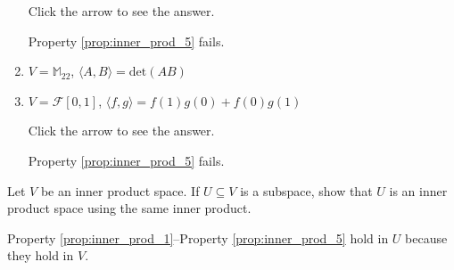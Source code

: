 \documentclass{ximera}
\begin{document}
\begin{problem}
\begin{enumerate}
Click the arrow to see the answer.
\begin{expandable}
Property \ref{prop:inner_prod_5} fails.
\end{expandable}

\item $V = \mathbb{M}_{22}$, $\langle A, B \rangle = \mbox{det}(AB)$

\item $V = \mathcal{F}[0, 1]$, $\langle f, g \rangle = f(1)g(0) + f(0)g(1)$

Click the arrow to see the answer.
\begin{expandable}
Property \ref{prop:inner_prod_5} fails.
\end{expandable}

\end{enumerate}
\end{problem}

\begin{problem}\label{prob:inner_prod_2}
Let $V$ be an inner product space. If $U \subseteq V$ is a subspace, show that $U$ is an inner product space using the same inner product.

\begin{hint}
 Property \ref{prop:inner_prod_1}--Property \ref{prop:inner_prod_5} hold in $U$ because they hold in $V$.
\end{hint}
\end{problem}
\end{document}
